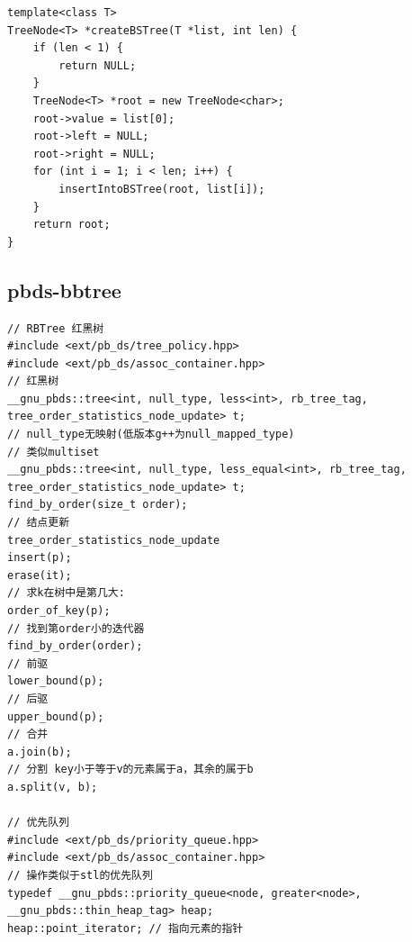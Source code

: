 \documentclass[twoside]{article}
\begin{document}
\begin{lstlisting}
template<class T>
TreeNode<T> *createBSTree(T *list, int len) {
    if (len < 1) {
        return NULL;
    }
    TreeNode<T> *root = new TreeNode<char>;
    root->value = list[0];
    root->left = NULL;
    root->right = NULL;
    for (int i = 1; i < len; i++) {
        insertIntoBSTree(root, list[i]);
    }
    return root;
}\end{lstlisting}
\subsection{pbds-bbtree}
\begin{lstlisting}
// RBTree 红黑树
#include <ext/pb_ds/tree_policy.hpp>
#include <ext/pb_ds/assoc_container.hpp>
// 红黑树
__gnu_pbds::tree<int, null_type, less<int>, rb_tree_tag, tree_order_statistics_node_update> t;
// null_type无映射(低版本g++为null_mapped_type)
// 类似multiset
__gnu_pbds::tree<int, null_type, less_equal<int>, rb_tree_tag, tree_order_statistics_node_update> t;
find_by_order(size_t order);
// 结点更新
tree_order_statistics_node_update
insert(p);
erase(it);
// 求k在树中是第几大:
order_of_key(p);
// 找到第order小的迭代器
find_by_order(order);
// 前驱
lower_bound(p);
// 后驱
upper_bound(p);
// 合并
a.join(b);
// 分割 key小于等于v的元素属于a，其余的属于b
a.split(v, b);

// 优先队列
#include <ext/pb_ds/priority_queue.hpp>
#include <ext/pb_ds/assoc_container.hpp>
// 操作类似于stl的优先队列
typedef __gnu_pbds::priority_queue<node, greater<node>, __gnu_pbds::thin_heap_tag> heap;
heap::point_iterator; // 指向元素的指针\end{lstlisting}
\end{document}
